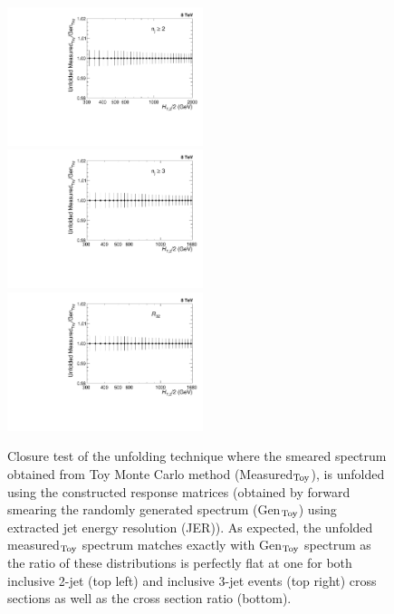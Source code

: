 \begin{figure}[!ht]
 \begin{center}
 \hspace*{-3mm}\includegraphics[width=0.51\textwidth]{Plots_HT_2_150/Ratio_Unfolding_NLO_2_funcI.pdf}%
 ~~\includegraphics[width=0.51\textwidth]{Plots_HT_2_150/Ratio_Unfolding_NLO_3_funcI.pdf}\\
 \includegraphics[width=0.51\textwidth]{Plots_HT_2_150/Ratio_Unfolding_NLO_Ratio_32_funcI.pdf}
 \caption{Closure test of the unfolding technique where the smeared spectrum obtained from Toy Monte Carlo method (Measured$_{\rm Toy}$), is unfolded using the constructed response matrices (obtained by forward smearing the randomly generated spectrum (Gen$_{\rm Toy}$) using extracted jet energy resolution (JER)). As expected, the unfolded measured$_{\rm Toy}$ spectrum matches exactly with Gen$_{\rm Toy}$ spectrum as the ratio of these distributions is perfectly flat at one for both inclusive 2-jet (top left) and inclusive 3-jet events (top right) cross sections as well as the cross section ratio \ratio (bottom).}
 \label{fig:unfolded_smeared}
 \end{center}
\end{figure}

